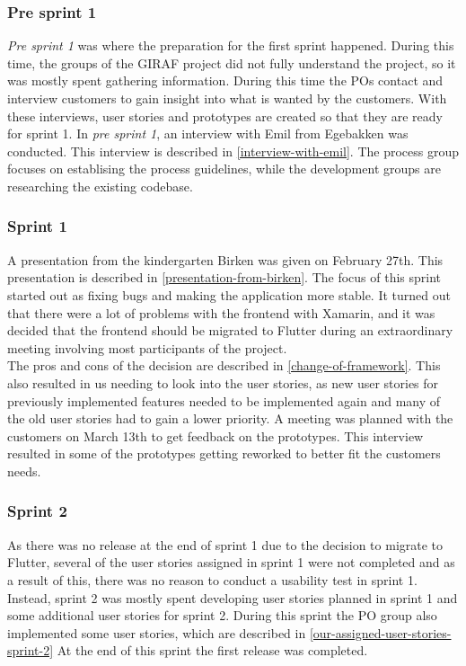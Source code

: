 \subsubsection{Pre sprint 1}
\textit{Pre sprint 1} was where the preparation for the first sprint happened.
During this time, the groups of the GIRAF project did not fully understand the project, so it was mostly spent gathering information.
During this time the POs contact and interview customers to gain insight into what is wanted by the customers.
With these interviews, user stories and prototypes are created so that they are ready for sprint 1.
In \textit{pre sprint 1}, an interview with Emil from Egebakken was conducted. 
This interview is described in \autoref{interview-with-emil}.
The process group focuses on establising the process guidelines, while the development groups are researching the existing codebase.

\subsubsection{Sprint 1}
A presentation from the kindergarten Birken was given on February 27th.
This presentation is described in \autoref{presentation-from-birken}.
The focus of this sprint started out as fixing bugs and making the application more stable.
It turned out that there were a lot of problems with the frontend with Xamarin, and it was decided that the frontend should be migrated to Flutter during an extraordinary meeting involving most participants of the project. \\
The pros and cons of the decision are described in \autoref{change-of-framework}.
This also resulted in us needing to look into the user stories, as new user stories for previously implemented features needed to be implemented again and many of the old user stories had to gain a lower priority.
A meeting was planned with the customers on March 13th to get feedback on the prototypes. 
This interview resulted in some of the prototypes getting reworked to better fit the customers needs.

\subsubsection{Sprint 2}
As there was no release at the end of sprint 1 due to the decision to migrate to Flutter, several of the user stories assigned in sprint 1 were not completed and as a result of this, there was no reason to conduct a usability test in sprint 1.
Instead, sprint 2 was mostly spent developing user stories planned in sprint 1 and some additional user stories for sprint 2.
During this sprint the PO group also implemented some user stories, which are described in \autoref{our-assigned-user-stories-sprint-2}
At the end of this sprint the first release was completed.

